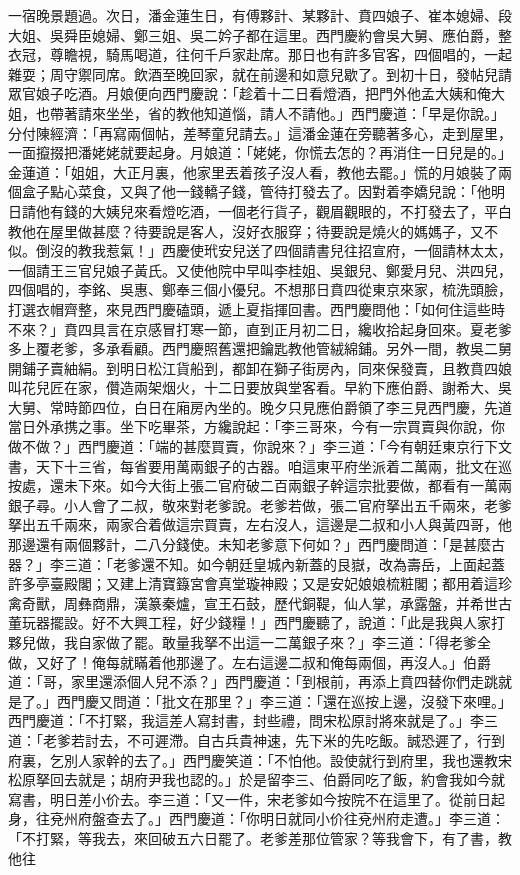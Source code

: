 一宿晚景題過。次日，潘金蓮生日，有傅夥計、某夥計、賁四娘子、崔本媳婦、段大姐、吳舜臣媳婦、鄭三姐、吳二妗子都在這里。西門慶約會吳大舅、應伯爵，整衣冠，尊瞻視，騎馬喝道，往何千戶家赴席。那日也有許多官客，四個唱的，一起雜耍；周守禦同席。飲酒至晚回家，就在前邊和如意兒歇了。到初十日，發帖兒請眾官娘子吃酒。月娘便向西門慶說：「趁着十二日看燈酒，把門外他孟大姨和俺大姐，也帶著請來坐坐，省的教他知道惱，請人不請他。」西門慶道：「早是你說。」分付陳經濟：「再寫兩個帖，差琴童兒請去。」這潘金蓮在旁聽著多心，走到屋里，一面攛掇把潘姥姥就要起身。月娘道：「姥姥，你慌去怎的？再消住一日兒是的。」金蓮道：「姐姐，大正月裏，他家里丟着孩子沒人看，教他去罷。」慌的月娘裝了兩個盒子點心菜食，又與了他一錢轎子錢，管待打發去了。因對着李嬌兒說：「他明日請他有錢的大姨兒來看燈吃酒，一個老行貨子，觀眉觀眼的，不打發去了，平白教他在屋里做甚麼？待要說是客人，沒好衣服穿；待要說是燒火的媽媽子，又不似。倒沒的教我惹氣！」西慶使玳安兒送了四個請書兒往招宣府，一個請林太太，一個請王三官兒娘子黃氏。又使他院中早叫李桂姐、吳銀兒、鄭愛月兒、洪四兒，四個唱的，李銘、吳惠、鄭奉三個小優兒。不想那日賁四從東京來家，梳洗頭臉，打選衣帽齊整，來見西門慶磕頭，遞上夏指揮回書。西門慶問他：「如何住這些時不來？」賁四具言在京感冒打寒一節，直到正月初二日，纔收拾起身回來。夏老爹多上覆老爹，多承看顧。西門慶照舊還把鑰匙教他管絨綿鋪。另外一間，教吳二舅開鋪子賣紬絹。到明日松江貨船到，都卸在獅子街房內，同來保發賣，且教賁四娘叫花兒匠在家，儹造兩架烟火，十二日要放與堂客看。早約下應伯爵、謝希大、吳大舅、常時節四位，白日在廂房內坐的。晚夕只見應伯爵領了李三見西門慶，先道當日外承携之事。坐下吃畢茶，方纔說起：「李三哥來，今有一宗買賣與你說，你做不做？」西門慶道：「端的甚麼買賣，你說來？」李三道：「今有朝廷東京行下文書，天下十三省，每省要用萬兩銀子的古器。咱這東平府坐派着二萬兩，批文在巡按處，還未下來。如今大街上張二官府破二百兩銀子幹這宗批要做，都看有一萬兩銀子尋。小人會了二叔，敬來對老爹說。老爹若做，張二官府拏出五千兩來，老爹拏出五千兩來，兩家合着做這宗買賣，左右沒人，這邊是二叔和小人與黃四哥，他那邊還有兩個夥計，二八分錢使。未知老爹意下何如？」西門慶問道：「是甚麼古器？」李三道：「老爹還不知。如今朝廷皇城內新蓋的艮嶽，改為壽岳，上面起蓋許多亭臺殿閣；又建上清寶籙宮會真堂璇神殿；又是安妃娘娘梳粧閣；都用着這珍禽奇獸，周彝商鼎，漢篆秦爐，宣王石鼓，歷代銅鞮，仙人掌，承露盤，并希世古董玩器擺設。好不大興工程，好少錢糧！」西門慶聽了，說道：「此是我與人家打夥兒做，我自家做了罷。敢量我拏不出這一二萬銀子來？」李三道：「得老爹全做，又好了！俺每就瞞着他那邊了。左右這邊二叔和俺每兩個，再沒人。」伯爵道：「哥，家里還添個人兒不添？」西門慶道：「到根前，再添上賁四替你們走跳就是了。」西門慶又問道：「批文在那里？」李三道：「還在巡按上邊，沒發下來哩。」西門慶道：「不打緊，我這差人寫封書，封些禮，問宋松原討將來就是了。」李三道：「老爹若討去，不可遲滯。自古兵貴神速，先下米的先吃飯。誠恐遲了，行到府裏，乞別人家幹的去了。」西門慶笑道：「不怕他。設使就行到府里，我也還教宋松原拏回去就是；胡府尹我也認的。」於是留李三、伯爵同吃了飯，約會我如今就寫書，明日差小价去。李三道：「又一件，宋老爹如今按院不在這里了。從前日起身，往兗州府盤查去了。」西門慶道：「你明日就同小价往兗州府走遭。」李三道：「不打緊，等我去，來回破五六日罷了。老爹差那位管家？等我會下，有了書，教他往